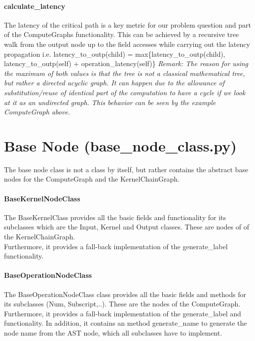 \paragraph{calculate\_latency}
The latency of the critical path is a key metric for our problem question and part of the ComputeGraphs functionality. This can be achieved by a recursive tree walk from the output node up to the field accesses while carrying out the latency propagation i.e. latency\_to\_outp(child) = max\{latency\_to\_outp(child), latency\_to\_outp(self) + operation\_latency(self)\}
\textit{Remark: The reason for using the maximum of both values is that the tree is not a classical mathematical tree, but rather a directed acyclic graph. It can happen due to the allowance of substitution/reuse of identical part of the computation to have a cycle if we look at it as an undirected graph. This behavior can be seen by the example ComputeGraph above.}







\section{Base Node (base\_node\_class.py)}
The base node class is not a class by itself, but rather contains the abstract base nodes for the ComputeGraph and the KernelChainGraph. \\


\paragraph{BaseKernelNodeClass}
The BaseKernelClass provides all the basic fields and functionality for its subclasses which are the Input, Kernel and Output classes. These are nodes of of the KernelChainGraph. \\
Furthermore, it provides a fall-back implementation of the generate\_label functionality.


\paragraph{BaseOperationNodeClass}
The BaseOperationNodeClass class provides all the basic fields and methods for its subclasses (Num, Subscript,..). These are the nodes of the ComputeGraph.\\
Furthermore, it provides a fall-back implementation of the generate\_label and functionality. In addition, it contains an method generate\_name to generate the node name from the AST node, which all subclasses have to implement.








